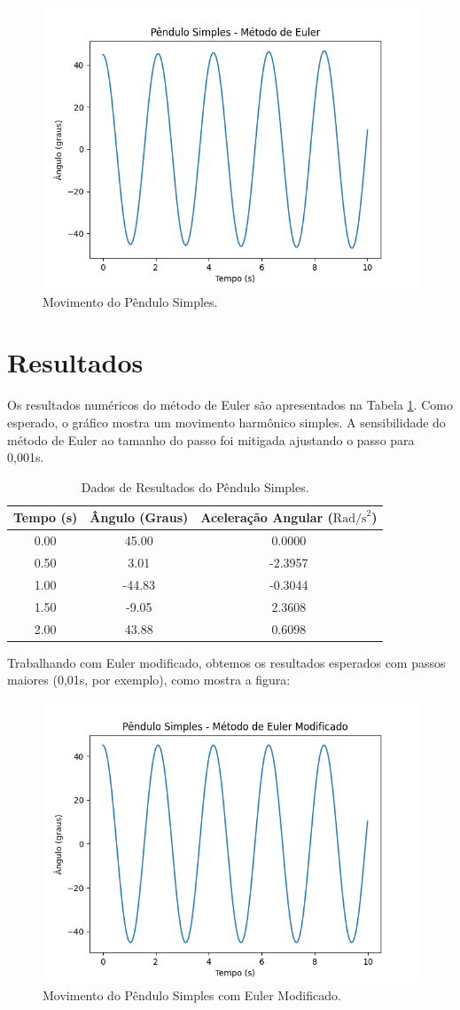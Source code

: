 \documentclass[a4paper, 10pt]{article}
\begin{document}
\begin{figure}[h]
    \centering
    \includegraphics[width=0.6\linewidth]{Figure_PenduloSimples.png}
    \caption{Movimento do Pêndulo Simples.}
    \label{fig:pendulo-simples}
\end{figure}

\section{Resultados}
Os resultados numéricos do método de Euler são apresentados na Tabela \ref{tab:resultados}. Como esperado, o gráfico mostra um movimento harmônico simples. A sensibilidade do método de Euler ao tamanho do passo foi mitigada ajustando o passo para 0,001s.\\

\begin{table}[h]
    \centering
    \begin{tabular}{|c|c|c|}
        \hline
        \textbf{Tempo (s)} & \textbf{Ângulo (Graus)} & \textbf{Aceleração Angular (\( \text{Rad/s}^2 \))} \\
        \hline
        0.00 & 45.00 & 0.0000 \\
        0.50 & 3.01 & -2.3957 \\
        1.00 & -44.83 & -0.3044 \\
        1.50 & -9.05 & 2.3608 \\
        2.00 & 43.88 & 0.6098 \\
        \hline
    \end{tabular}
    \caption{Dados de Resultados do Pêndulo Simples.}
    \label{tab:resultados}
\end{table}

Trabalhando com Euler modificado, obtemos os resultados esperados com passos maiores (0,01s, por exemplo), como mostra a figura:

\begin{figure}[h]
    \centering
    \includegraphics[width=0.5\linewidth]{Figure_PenduloSimplesModificado.png}
    \caption{Movimento do Pêndulo Simples com Euler Modificado.}
    \label{fig:pendulo-modificado}
\end{figure}
\end{document}
